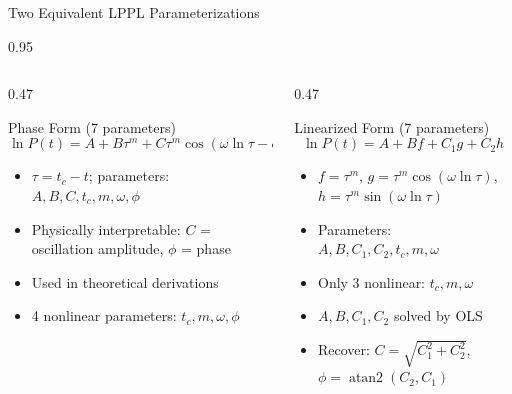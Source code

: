 \documentclass[9pt, aspectratio=169, t]{beamer}
\begin{document}
\begin{frame}{Two Equivalent LPPL Parameterizations}
    \begin{cminipage}{0.95\textwidth}
    {\footnotesize
    \begin{columns}[T]
        \begin{column}{0.47\textwidth}
            \begin{block}{Phase Form (7 parameters)}
                \begin{equation*}
                    \ln P(t) = A + B\tau^m + C\tau^m \cos(\omega \ln\tau - \phi)
                \end{equation*}
                \begin{itemize}\setlength{\itemsep}{0pt}
                    \item $\tau = t_c - t$; parameters: $A, B, C, t_c, m, \omega, \phi$
                    \item Physically interpretable: $C$ = oscillation amplitude, $\phi$ = phase
                    \item Used in theoretical derivations
                    \item 4 nonlinear parameters: $t_c, m, \omega, \phi$
                \end{itemize}
            \end{block}
        \end{column}
        \begin{column}{0.47\textwidth}
            \begin{alertblock}{Linearized Form (7 parameters)}
                \begin{equation*}
                    \ln P(t) = A + Bf + C_1 g + C_2 h
                \end{equation*}
                \begin{itemize}\setlength{\itemsep}{0pt}
                    \item $f = \tau^m$, $g = \tau^m\cos(\omega\ln\tau)$, $h = \tau^m\sin(\omega\ln\tau)$
                    \item Parameters: $A, B, C_1, C_2, t_c, m, \omega$
                    \item Only 3 nonlinear: $t_c, m, \omega$
                    \item $A, B, C_1, C_2$ solved by OLS
                    \item Recover: $C = \sqrt{C_1^2 + C_2^2}$, $\phi = \operatorname{atan2}(C_2, C_1)$
                \end{itemize}
            \end{alertblock}
        \end{column}
    \end{columns}

}
\end{cminipage}
\end{frame}
\end{document}
